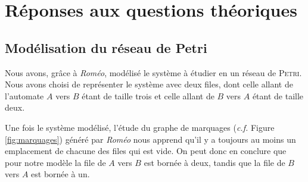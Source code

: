 \chapter{Réponses aux questions théoriques}\label{chap:Rep}


\section{Modélisation du réseau de Petri}
Nous avons, grâce à \emph{Roméo}, modélisé le système à étudier en un réseau de \textsc{Petri}. Nous avons choisi de représenter le système avec deux files, dont celle allant de l'automate $A$ vers $B$ étant de taille trois et celle allant de $B$ vers $A$ étant de taille deux.

Une fois le système modélisé, l'étude du graphe de marquages (\emph{c.f.} Figure \ref{fig:marquages}) généré par \emph{Roméo} nous apprend qu'il y a toujours au moins un emplacement de chacune des files qui est vide. On peut donc en conclure que pour notre modèle la file de $A$ vers $B$ est bornée à deux, tandis que la file de $B$ vers $A$ est bornée à un.



